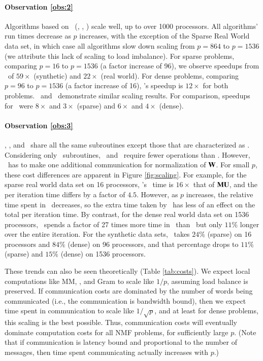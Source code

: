 \paragraph{Observation \ref{obs:2}}
Algorithms based on \ParNMF\ (\MU, \HALS, \BPP) scale well, up to over 1000 processors.
All algorithms' run times decrease as $p$ increases, with the exception of the Sparse Real World data set, in which case all algorithms slow down scaling from $p=864$ to $p=1536$ (we attribute this lack of scaling to load imbalance).
For sparse problems, comparing $p=16$ to $p=1536$ (a factor increase of 96), we observe speedups from \BPP\ of $59\times$ (synthetic) and $22\times$ (real world).
For dense problems, comparing $p=96$ to $p=1536$ (a factor increase of 16), \BPP's speedup is $12\times$ for both problems.
\MU\ and \HALS\ demonstrate similar scaling results.
For comparison, speedups for \Naive\ were $8\times$ and $3\times$ (sparse) and $6\times$ and $4\times$ (dense).

\paragraph{Observation \ref{obs:3}}
\MU, \HALS, and \BPP\ share all the same subroutines except those that are characterized as \LUC.
Considering only \LUC\ subroutines, \MU\ and \HALS\ require fewer operations than \BPP. However, \HALS\ has to make one additional communication for normalization of $\mathbf{W}$. 
For small $p$, these cost differences are apparent in Figure \ref{fig:scaling}.
For example, for the sparse real world data set on 16 processors, \BPP's \LUC\ time is $16\times$ that of $\textbf{MU}$, and the per iteration time differs by a factor of $4.5$.
However, as $p$ increases, the relative time spent in \LUC\ decreases, so the extra time taken by \BPP\ has less of an effect on the total per iteration time.
By contrast, for the dense real world data set on 1536 processors, \BPP\ spends a factor of 27 times more time in \LUC\ than \MU\ but only $11\%$ longer over the entire iteration.
For the synthetic data sets, \LUC\ takes $24\%$ (sparse) on 16 processors and $84\%$ (dense) on 96 processors, and that percentage drops to $11\%$ (sparse) and $15\%$ (dense) on 1536 processors.

These trends can also be seen theoretically (Table \ref{tab:costs}).
We expect local computations like MM, \LUC, and Gram to scale like $1/p$, assuming load balance is preserved.
If communication costs are dominated by the number of words being communicated (i.e., the communication is bandwidth bound), then we expect time spent in communication to scale like $1/\sqrt p$, and at least for dense problems, this scaling is the best possible.
Thus, communication costs will eventually dominate computation costs for all NMF problems, for sufficiently large $p$.
(Note that if communication is latency bound and proportional to the number of messages, then time spent communicating actually increases with $p$.)

